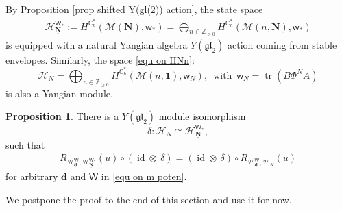 \documentclass[10pt]{amsart}
\theoremstyle{definition}
\newtheorem{Proposition}[Theorem]{Proposition}
\numberwithin{equation}{section}
\newcommand{\bC}{\mathbb{C}}
\newcommand{\bZ}{\mathbb{Z}}
\newcommand{\bd}{\mathbf{d}}
\newcommand{\cM}{\mathcal{M}}
\newcommand{\sW}{\mathsf{W}}
\newcommand{\sw}{\mathsf{w}}
\newcommand{\tr}{\operatorname{tr}}
\newcommand{\id}{\operatorname{id}}
\begin{document}
By Proposition \ref{prop shifted Y(gl(2)) action}, the state space 
\begin{align*}
    \mathcal H_{\underline{\mathbf N}}^{\sW_*}:=H^{\bC^*_\hbar}(\cM(\mathbf N),\sw_*)=\bigoplus_{n\in \bZ_{\geqslant 0}} H^{\bC^*_\hbar}(\cM(n,\mathbf N),\sw_*)
\end{align*}
is equipped with a natural Yangian algebra $Y(\mathfrak{gl}_2)$ action coming from stable envelopes.
Similarly, the space \eqref{equ on HNn}: 
$$\mathcal H_N=\bigoplus_{n\in \bZ_{\geqslant 0}} H^{\bC^*_\hbar}(\cM(n,\mathbf 1),\sw_N), \,\,\, \mathrm{with} \,\,\, \sw_N=\tr(B\Phi^NA) $$
is also a Yangian module. 

\begin{Proposition}\label{prop comp dim red for higher spin}
There is a $Y(\mathfrak{gl}_2)$ module isomorphism 
\begin{equation}\label{equ on delt}\delta\colon \mathcal H_N\cong \mathcal H_{\underline{\mathbf N}}^{\sW_*}, \end{equation} 
such that 
\begin{align*}
    R_{\mathcal H^{\sW}_{\underline{\bd}},\mathcal H_{\underline{\mathbf N}}^{\sW_*}}(u)\circ(\id\otimes \:\delta)=(\id\otimes \:\delta)\circ R_{\mathcal H^{\sW}_{\underline{\bd}},\mathcal H_N}(u)
\end{align*}
for arbitrary $\underline{\bd}$ and $\sW$ in \eqref{equ on m poten}.
\end{Proposition}

We postpone the proof to the end of this section and use it for now. 
\end{document}
